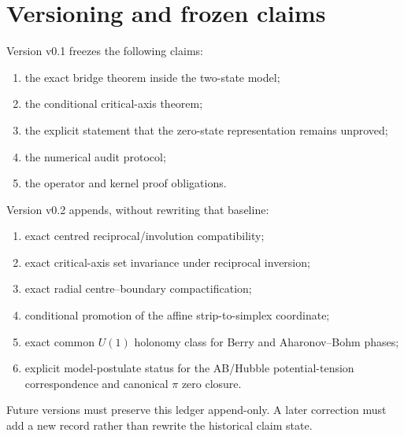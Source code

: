 \section{Versioning and frozen claims}
Version v0.1 freezes the following claims:
\begin{enumerate}
\item the exact bridge theorem inside the two-state model;
\item the conditional critical-axis theorem;
\item the explicit statement that the zero-state representation remains unproved;
\item the numerical audit protocol;
\item the operator and kernel proof obligations.
\end{enumerate}
Version v0.2 appends, without rewriting that baseline:
\begin{enumerate}
\item exact centred reciprocal/involution compatibility;
\item exact critical-axis set invariance under reciprocal inversion;
\item exact radial centre--boundary compactification;
\item conditional promotion of the affine strip-to-simplex coordinate;
\item exact common $U(1)$ holonomy class for Berry and Aharonov--Bohm phases;
\item explicit model-postulate status for the AB/Hubble potential-tension correspondence and canonical $\pi$ zero closure.
\end{enumerate}
Future versions must preserve this ledger append-only. A later correction must add a new record rather than rewrite the historical claim state.

